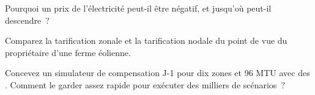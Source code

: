 \begin{interviewq}\label{iq:m3:power-markets-design:4}
Pourquoi un prix de l'électricité peut-il être négatif, et jusqu'où peut-il descendre~?
\end{interviewq}

\begin{interviewq}\label{iq:m3:power-markets-design:5}
Comparez la tarification zonale et la tarification nodale du point de vue du propriétaire d'une ferme éolienne.
\end{interviewq}

\begin{interviewq}\label{iq:m3:power-markets-design:6}
Concevez un simulateur de compensation J-1 pour dix zones et 96 MTU avec des . Comment
le garder assez rapide pour exécuter des milliers de scénarios~?
\end{interviewq}

